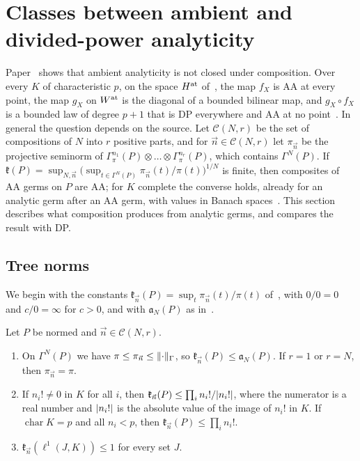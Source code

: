 \section{Classes between ambient and divided-power analyticity}\label{dp:sec:chain}

Paper~\cite{I} shows that ambient analyticity is not closed under composition. Over every $K$ of characteristic $p$, on the space $H^{\rm at}$ of~\cite[Definition~14.16]{I}, the map $f_X$ is AA at every point, the map $g_X$ on $W^{\rm at}$ is the diagonal of a bounded bilinear map, and $g_X\circ f_X$ is a bounded law of degree $p+1$ that is DP everywhere and AA at no point~\cite[Theorem~14.17]{I}. In general the question depends on the source. Let $\mathcal C(N,r)$ be the set of compositions of $N$ into $r$ positive parts, and for $\vec n\in\mathcal C(N,r)$ let $\pi_{\vec n}$ be the projective seminorm of $\Gamma^{n_1}_\pi(P)\otimes\dots\otimes\Gamma^{n_r}_\pi(P)$, which contains $\Gamma^N(P)$. If $\mathfrak k(P)=\sup_{N,\vec n}\bigl(\sup_{t\in\Gamma^N(P)}\pi_{\vec n}(t)/\pi(t)\bigr)^{1/N}$ is finite, then composites of AA germs on $P$ are AA; for $K$ complete the converse holds, already for an analytic germ after an AA germ, with values in Banach spaces~\cite[Definition~14.21, Theorem~14.22]{I}. This section describes what composition produces from analytic germs, and compares the result with DP.

\subsection{Tree norms}\label{dp:ssec:tree}

We begin with the constants $\mathfrak k_{\vec n}(P)=\sup_t\pi_{\vec n}(t)/\pi(t)$ of~\cite[Definition~14.21]{I}, with $0/0=0$ and $c/0=\infty$ for $c>0$, and with $\mathfrak a_N(P)$ as in~\cite[Definition~14.36]{I}.

\begin{lemma}\label{dp:lem:kappa-bounds}
Let $P$ be normed and $\vec n\in\mathcal C(N,r)$.
\begin{enumerate}
\item On $\Gamma^N(P)$ we have $\pi\le\pi_{\vec n}\le\lVert \cdot\rVert_\Gamma$, so $\mathfrak k_{\vec n}(P)\le\mathfrak a_N(P)$. If $r=1$ or $r=N$, then $\pi_{\vec n}=\pi$.
\item If $n_i!\ne0$ in $K$ for all $i$, then $\mathfrak k_{\vec n}(P)\le\prod_in_i!/\lvert n_i!\rvert$, where the numerator is a real number and $\lvert n_i!\rvert$ is the absolute value of the image of $n_i!$ in $K$. If $\operatorname{char}K=p$ and all $n_i<p$, then $\mathfrak k_{\vec n}(P)\le\prod_in_i!$.
\item $\mathfrak k_{\vec n}(\ell^1(J,K))\le1$ for every set $J$.
\end{enumerate}
\end{lemma}

